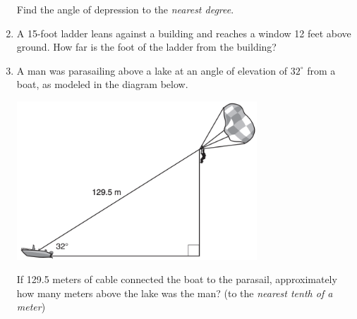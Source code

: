 \documentclass[12pt, twoside]{article}
\begin{document}
\begin{enumerate}
  Find the angle of depression to the \emph{nearest degree}.
  \begin{center}
    \end{center} \vspace{4cm}

\item A 15-foot ladder leans against a building and reaches a window 12 feet above ground. How far is the foot of the ladder from the building?

\newpage
\item A man was parasailing above a lake at an angle of elevation of $32^\circ$ from a boat, as modeled in the diagram below.
  \begin{center}
    \includegraphics[width=9cm]{../graphics/parasail.png}
  \end{center}
If 129.5 meters of cable connected the boat to the parasail, approximately how many meters above the lake was the man? (to the \emph{nearest tenth of a meter})


\end{enumerate}
\end{document}
